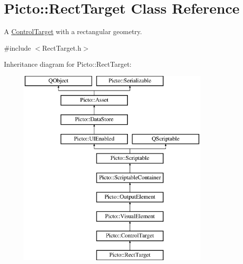 \hypertarget{class_picto_1_1_rect_target}{\section{Picto\-:\-:Rect\-Target Class Reference}
\label{class_picto_1_1_rect_target}
}


A \hyperlink{class_picto_1_1_control_target}{Control\-Target} with a rectangular geometry.  




{\ttfamily \#include $<$Rect\-Target.\-h$>$}

Inheritance diagram for Picto\-:\-:Rect\-Target\-:\begin{figure}[H]
\begin{center}
\leavevmode
\includegraphics[height=10.000000cm]{class_picto_1_1_rect_target}
\end{center}
\end{figure}
